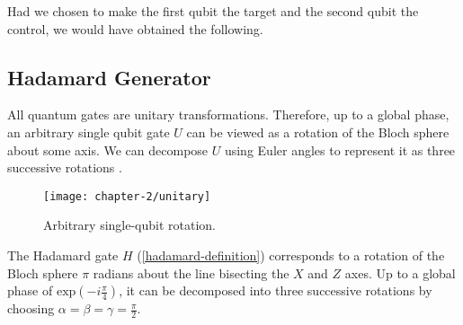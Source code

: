 Had we chosen to make the first qubit the target and the second qubit the control, we would have obtained the following.


\subsection{Hadamard Generator}

All quantum gates are unitary transformations. Therefore, up to a global phase, an arbitrary single qubit gate $U$ can be viewed as a rotation of the Bloch sphere about some axis. We can decompose $U$ using Euler angles to represent it as three successive rotations \cite{Wetering2020}.

\begin{figure}[H]
    \centering
    \texttt{[image: chapter-2/unitary]}
    \caption{Arbitrary single-qubit rotation.}
\end{figure}

The Hadamard gate $H$ (\ref{hadamard-definition}) corresponds to a rotation of the Bloch sphere $\pi$ radians about the line bisecting the $X$ and $Z$ axes. Up to a global phase of $\text{exp} \left(-i \frac{\pi}{4} \right)$, it can be decomposed into three successive rotations by choosing $\alpha = \beta = \gamma = \frac{\pi}{2}$. 

